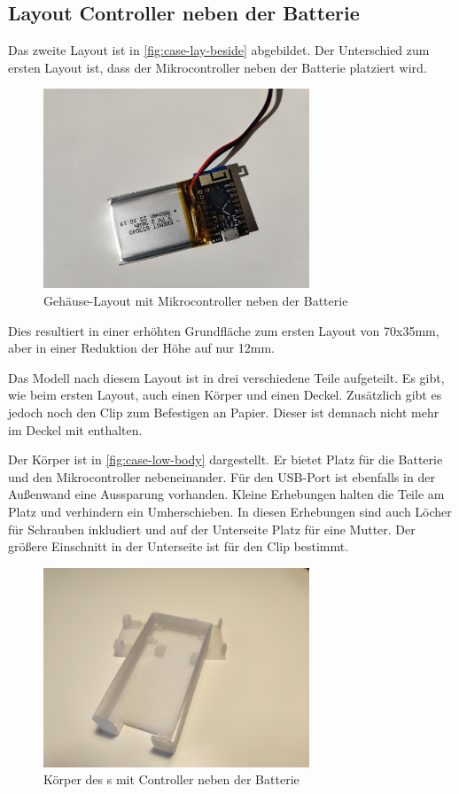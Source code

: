 \FloatBarrier

\subsection{Layout Controller neben der Batterie}
Das zweite Layout ist in \autoref{fig:case-lay-beside} abgebildet.
Der Unterschied zum ersten Layout ist, dass der Mikrocontroller neben der Batterie platziert wird.

\begin{figure}[htbp]
	\includegraphics[width=300px]{images/case/pico_beside_battery.jpg}
	\centering
	\caption{Gehäuse-Layout mit Mikrocontroller neben der Batterie}
	\label{fig:case-lay-beside}
\end{figure}

Dies resultiert in einer erhöhten Grundfläche zum ersten Layout von 70x35mm, aber in einer Reduktion der Höhe auf nur 12mm.

Das Modell nach diesem Layout ist in drei verschiedene Teile aufgeteilt.
Es gibt, wie beim ersten Layout, auch einen Körper und einen Deckel.
Zusätzlich gibt es jedoch noch den Clip zum Befestigen an Papier.
Dieser ist demnach nicht mehr im Deckel mit enthalten.

Der Körper ist in \autoref{fig:case-low-body} dargestellt.
Er bietet Platz für die Batterie und den Mikrocontroller nebeneinander.
Für den \gls{USB}-Port ist ebenfalls in der Außenwand eine Aussparung vorhanden.
Kleine Erhebungen halten die Teile am Platz und verhindern ein Umherschieben.
In diesen Erhebungen sind auch Löcher für Schrauben inkludiert und auf der Unterseite Platz für eine Mutter.
Der größere Einschnitt in der Unterseite ist für den Clip bestimmt.

\begin{figure}[htbp]
	\includegraphics[width=300px]{images/case/low_body.jpg}
	\centering
	\caption{Körper des s mit Controller neben der Batterie}
	\label{fig:case-low-body}
\end{figure}


